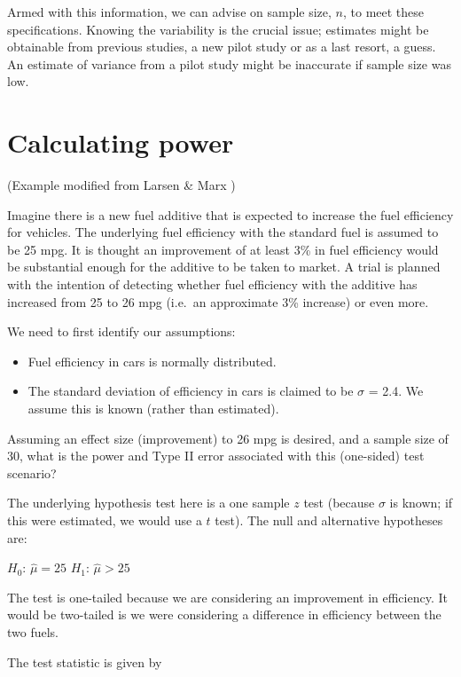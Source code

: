 \documentclass[
  oneside]{krantz}
\providecommand{\tightlist}{%
  \setlength{\itemsep}{0pt}\setlength{\parskip}{0pt}}
\begin{document}
Armed with this information, we can advise on sample size, \(n\), to meet these specifications. Knowing the variability is the crucial issue; estimates might be obtainable from previous studies, a new pilot study or as a last resort, a guess. An estimate of variance from a pilot study might be inaccurate if sample size was low.

\hypertarget{calculating-power}{%
\section{Calculating power}\label{calculating-power}}

(Example modified from Larsen \& Marx \citeyearpar{Larsen&Marx2006})

Imagine there is a new fuel additive that is expected to increase the fuel efficiency for vehicles. The underlying fuel efficiency with the standard fuel is assumed to be 25 mpg. It is thought an improvement of at least 3\% in fuel efficiency would be substantial enough for the additive to be taken to market. A trial is planned with the intention of detecting whether fuel efficiency with the additive has increased from 25 to 26 mpg (i.e.~an approximate 3\% increase) or even more.

We need to first identify our assumptions:

\begin{itemize}
\tightlist
\item
  Fuel efficiency in cars is normally distributed.
\item
  The standard deviation of efficiency in cars is claimed to be \(\sigma\) = 2.4. We assume this is known (rather than estimated).
\end{itemize}

Assuming an effect size (improvement) to 26 mpg is desired, and a sample size of 30, what is the power and Type II error associated with this (one-sided) test scenario?

The underlying hypothesis test here is a one sample \(z\) test (because \(\sigma\) is known; if this were estimated, we would use a \(t\) test). The null and alternative hypotheses are:

\(H_0\): \(\hat \mu = 25\)
\(H_1\): \(\hat \mu > 25\)

The test is one-tailed because we are considering an improvement in efficiency. It would be two-tailed is we were considering a difference in efficiency between the two fuels.

The test statistic is given by
\end{document}
